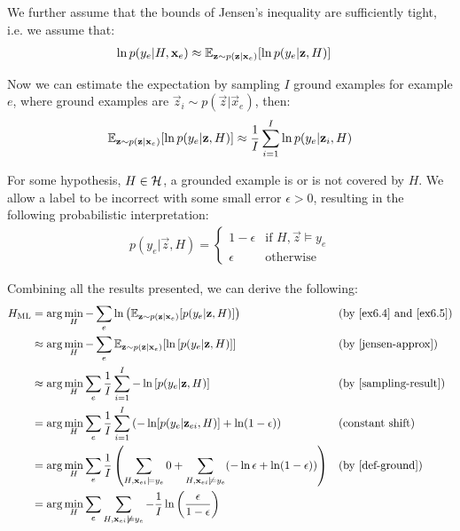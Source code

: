 We further assume that the bounds of Jensen's inequality are sufficiently tight, i.e. we assume that:
\begin{align}
\ln p(y_e|H, \textbf{x}_e)
&\approx \mathbb{E}_{\textbf{z} \sim p(\textbf{z}| \textbf{x}_e)}[\ln  p(y_e|\textbf{z},H)] \label{jensen-approx}
\end{align}

Now we can estimate the expectation by sampling $I$ ground examples for example $e$, where ground examples are $\vec{z}_{i} \sim p(\vec{z}| \vec{x}_e)$, then:
\begin{align}
\mathbb{E}_{\textbf{z} \sim p(\textbf{z}| \textbf{x}_e)}[\ln  p(y_e|\textbf{z},H)]
\approx \frac{1}{I} \sum_{i=1}^{I} \ln  p(y_e|\textbf{z}_i,H) \label{sampling-result}
\end{align}

For some hypothesis, $H\in \mathcal{H}$, a grounded example is or is not covered by $H$. We allow a label to be incorrect with some small error $\epsilon > 0$, resulting in the following probabilistic interpretation:
\begin{align}
p(y_e | \vec{z}, H) =
\begin{cases}
1 - \epsilon & \text{if } H, \vec{z} \models y_e \\
\epsilon & \text{otherwise}
\label{def-ground}
\end{cases}
\end{align}

Combining all the results presented, we can derive the following:
\begin{align}
H_{\text{ML}}
& = \arg\min_{H} 
-\sum_e \ln \left( \mathbb{E}_{\textbf{z} \sim p(\textbf{z}| \textbf{x}_e)}[p(y_e|\textbf{z},H)] \right ) 
&& \text{(by \ref{ex6.4} and \ref{ex6.5})} \nonumber \\
& \approx \arg\min_{H}
-\sum_e \mathbb{E}_{\textbf{z} \sim p(\textbf{z}| \textbf{x}_e)}[\ln \left[ p(y_e|\textbf{z},H) \right ]]  
&& \text{(by \ref{jensen-approx})} \nonumber \\
& \approx \arg\min_{H}
\sum_e \frac{1}{I} \sum_{i=1}^I -\ln \left[ p(y_e|\textbf{z},H) \right ]
&& \text{(by \ref{sampling-result})} \nonumber \\
& = \arg\min_{H} \sum_e \frac{1}{I} \sum_{i=1}^I  \left(-\ln  [p(y_e|\textbf{z}_{ei},H)] + \ln (1-\epsilon) \right)
&& \text{(constant shift)} \nonumber \\
& = \arg\min_{H}
\sum_e \frac{1}{I} 
\left (
\sum_{H,\textbf{x}_{ei}\models y_e} 0
+
\sum_{H,\textbf{x}_{ei}\not\models y_e} (-\ln \epsilon + \ln (1 - \epsilon))
\right ) 
&& \text{(by \ref{def-ground})} \nonumber \\
& = \arg\min_{H}
\sum_e  
\sum_{H,\textbf{x}_{ei}\not\models y_e} -\frac{1}{I}\ln \left ( \frac{\epsilon}{1 - \epsilon} \right ) \label{eq-final-no-int}
\end{align}


